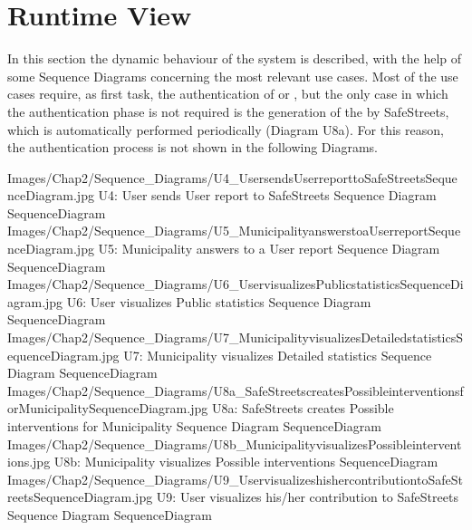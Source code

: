 \documentclass[../../DD.tex]{subfiles}
\begin{document}
\section{Runtime View\label{sect:2.4}}

In this section the dynamic behaviour of the system is described, with the help of some Sequence Diagrams concerning the most relevant use cases.
Most of the use cases require, as first task, the authentication of  or , but the only case in which the authentication phase is not required is the generation of the  by SafeStreets, which is automatically performed periodically (Diagram U8a). For this reason, the authentication process is not shown in the following Diagrams.

\image {10cm} {Images/Chap2/Sequence_Diagrams/U4_UsersendsUserreporttoSafeStreetsSequenceDiagram.jpg} {U4: User sends User report to SafeStreets Sequence Diagram} {SequenceDiagram}
\image {8cm} {Images/Chap2/Sequence_Diagrams/U5_MunicipalityanswerstoaUserreportSequenceDiagram.jpg} {U5: Municipality answers to a User report Sequence Diagram} {SequenceDiagram}
\image {8cm} {Images/Chap2/Sequence_Diagrams/U6_UservisualizesPublicstatisticsSequenceDiagram.jpg} {U6: User visualizes Public statistics Sequence Diagram} {SequenceDiagram}
\image {12cm} {Images/Chap2/Sequence_Diagrams/U7_MunicipalityvisualizesDetailedstatisticsSequenceDiagram.jpg} {U7: Municipality visualizes Detailed statistics Sequence Diagram} {SequenceDiagram}
\image {10cm} {Images/Chap2/Sequence_Diagrams/U8a_SafeStreetscreatesPossibleinterventionsforMunicipalitySequenceDiagram.jpg} {U8a: SafeStreets creates Possible interventions for Municipality Sequence Diagram} {SequenceDiagram}
\image {4cm} {Images/Chap2/Sequence_Diagrams/U8b_MunicipalityvisualizesPossibleinterventions.jpg} {U8b: Municipality visualizes Possible interventions} {SequenceDiagram}
\image {8cm} {Images/Chap2/Sequence_Diagrams/U9_UservisualizeshishercontributiontoSafeStreetsSequenceDiagram.jpg} {U9: User visualizes his/her contribution to SafeStreets Sequence Diagram} {SequenceDiagram}

\newpage
\end{document}
